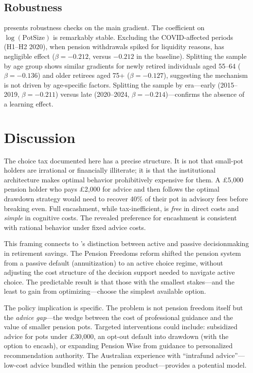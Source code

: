 \documentclass[12pt]{article}
\begin{document}
\subsection{Robustness}

 presents robustness checks on the main gradient. The coefficient on $\log(\text{PotSize})$ is remarkably stable. Excluding the COVID-affected periods (H1--H2 2020), when pension withdrawals spiked for liquidity reasons, has negligible effect ($\beta = -0.212$, versus $-0.212$ in the baseline). Splitting the sample by age group shows similar gradients for newly retired individuals aged 55--64 ($\beta = -0.136$) and older retirees aged 75+ ($\beta = -0.127$), suggesting the mechanism is not driven by age-specific factors. Splitting the sample by era---early (2015--2019, $\beta = -0.211$) versus late (2020--2024, $\beta = -0.214$)---confirms the absence of a learning effect.



\section{Discussion}

The choice tax documented here has a precise structure. It is not that small-pot holders are irrational or financially illiterate; it is that the institutional architecture makes optimal behavior prohibitively expensive for them. A \pounds5,000 pension holder who pays \pounds2,000 for advice and then follows the optimal drawdown strategy would need to recover 40\% of their pot in advisory fees before breaking even. Full encashment, while tax-inefficient, is \textit{free} in direct costs and \textit{simple} in cognitive costs. The revealed preference for encashment is consistent with rational behavior under fixed advice costs.

This framing connects to \citet{chetty2014active}'s distinction between active and passive decisionmaking in retirement savings. The Pension Freedoms reform shifted the pension system from a passive default (annuitization) to an active choice regime, without adjusting the cost structure of the decision support needed to navigate active choice. The predictable result is that those with the smallest stakes---and the least to gain from optimizing---choose the simplest available option.

The policy implication is specific. The problem is not pension freedom itself but the \textit{advice gap}---the wedge between the cost of professional guidance and the value of smaller pension pots. Targeted interventions could include: subsidized advice for pots under \pounds30,000, an opt-out default into drawdown (with the option to encash), or expanding Pension Wise from guidance to personalized recommendation authority. The Australian experience with ``intrafund advice''---low-cost advice bundled within the pension product---provides a potential model.
\end{document}
